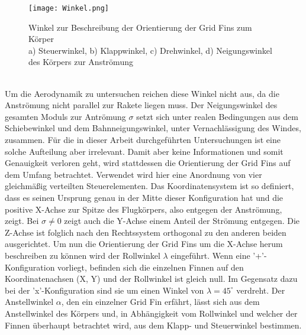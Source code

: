 \begin{figure}[h]
	\centering
	\texttt{[image: Winkel.png]}
	\caption{Winkel zur Beschreibung der Orientierung der Grid Fins zum Körper\\a) Steuerwinkel, b) Klappwinkel, c) Drehwinkel, d) Neigungswinkel des Körpers zur Anströmung}
	\label{abb_winkel}
\end{figure}\\
Um die Aerodynamik zu untersuchen reichen diese Winkel nicht aus, da die Anströmung nicht parallel zur Rakete liegen muss. Der Neigungswinkel des gesamten Moduls zur Antrömung $\sigma$ setzt sich unter realen Bedingungen aus dem Schiebewinkel und dem Bahnneigungswinkel, unter Vernachlässigung des Windes, zusammen. Für die in dieser Arbeit durchgeführten Untersuchungen ist eine solche Aufteilung aber irrelevant. Damit aber keine Informationen und somit Genauigkeit verloren geht, wird stattdessen die Orientierung der Grid Fins auf dem Umfang betrachtet. Verwendet wird hier eine Anordnung von vier gleichmäßig verteilten Steuerelementen. Das Koordinatensystem ist so definiert, dass es seinen Ursprung genau in der Mitte dieser Konfiguration hat und die positive X-Achse zur Spitze des Flugkörpers, also entgegen der Anströmung, zeigt. Bei $\sigma \neq 0$ zeigt auch die Y-Achse einem Anteil der Strömung entgegen. Die Z-Achse ist folglich nach den Rechtssystem orthogonal zu den anderen beiden ausgerichtet. Um nun die Orientierung der Grid Fins um die X-Achse herum beschreiben zu können wird der Rollwinkel $\lambda$ eingeführt. Wenn eine '+'-Konfiguration vorliegt, befinden sich die einzelnen Finnen auf den Koordinatenachsen (X, Y) und der Rollwinkel ist gleich null. Im Gegensatz dazu bei der 'x'-Konfiguration sind sie um einen Winkel von $\lambda = 45^\circ$ verdreht. Der Anstellwinkel $\alpha$, den ein einzelner Grid Fin erfährt, lässt sich aus dem Anstellwinkel des Körpers und, in Abhängigkeit vom Rollwinkel und welcher der Finnen überhaupt betrachtet wird, aus dem Klapp- und Steuerwinkel bestimmen.
